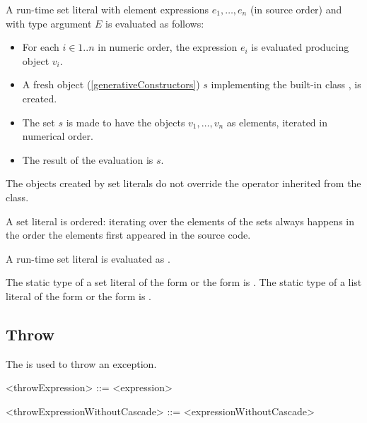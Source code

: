 \documentclass[makeidx]{article}
\begin{document}
{\LMHash{}%
A run-time set literal with element expressions $e_1, \ldots, e_n$
(in source order) and with type argument $E$
is evaluated as follows:
\begin{itemize}
\item
For each $i \in 1 .. n$ in numeric order,
the expression $e_i$ is evaluated producing object $v_i$.
\item A fresh object (\ref{generativeConstructors}) $s$
implementing the built-in class , is created.
\item The set $s$ is made to have the objects $v_1, \ldots{} , v_n$ as elements,
iterated in numerical order.
\item
The result of the evaluation is $s$.
\end{itemize}

\LMHash{}%
The objects created by set literals do not override
the \lit{==} operator inherited from the  class.

\LMHash{}%
A set literal is ordered: iterating over the elements of the sets
always happens in the order the elements first appeared in the source code.


\LMHash{}%
A run-time set literal
is evaluated as
.

\LMHash{}%
The static type of a set literal of the form
or the form
is
.
%
The static type of a list literal of the form
or the form
is .


\subsection{Throw}

\LMHash{}%
The  is used to throw an exception.

\begin{grammar}
<throwExpression> ::= \THROW{} <expression>

<throwExpressionWithoutCascade> ::= \THROW{} <expressionWithoutCascade>
\end{grammar}

}
\end{document}
